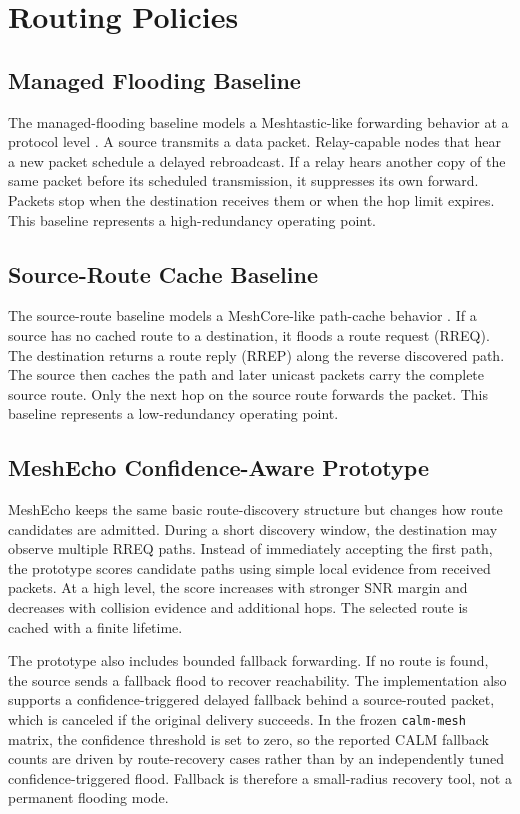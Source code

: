 \documentclass[conference]{IEEEtran}
\begin{document}
\section{Routing Policies}

\subsection{Managed Flooding Baseline}

The managed-flooding baseline models a Meshtastic-like forwarding behavior at a
protocol level \cite{meshtasticdocs}. A source transmits a data packet.
Relay-capable nodes that hear a new packet schedule a delayed rebroadcast. If a
relay hears another copy of the same packet before its scheduled transmission,
it suppresses its own forward. Packets stop when the destination receives them
or when the hop limit expires. This baseline represents a high-redundancy
operating point.

\subsection{Source-Route Cache Baseline}

The source-route baseline models a MeshCore-like path-cache behavior
\cite{meshcore}. If a source has no cached route to a destination, it floods a
route request (RREQ). The destination returns a route reply (RREP) along the
reverse discovered path. The source then caches the path and later unicast
packets carry the complete source route. Only the next hop on the source route
forwards the packet. This baseline represents a low-redundancy operating point.

\subsection{MeshEcho Confidence-Aware Prototype}

MeshEcho keeps the same basic route-discovery structure but changes how route
candidates are admitted.
During a short discovery window, the destination may observe multiple RREQ
paths. Instead of immediately accepting the first path, the prototype scores
candidate paths using simple local evidence from received packets. At a high
level, the score increases with stronger SNR margin and decreases with collision
evidence and additional hops. The selected route is cached with a finite
lifetime.

The prototype also includes bounded fallback forwarding. If no route is found,
the source sends a fallback flood to recover reachability. The implementation
also supports a confidence-triggered delayed fallback behind a source-routed
packet, which is canceled if the original delivery succeeds. In the frozen
\texttt{calm-mesh} matrix, the confidence threshold is set to zero, so the
reported CALM fallback counts are driven by route-recovery cases rather than by
an independently tuned confidence-triggered flood. Fallback is therefore a
small-radius recovery tool, not a permanent flooding mode.
\end{document}
